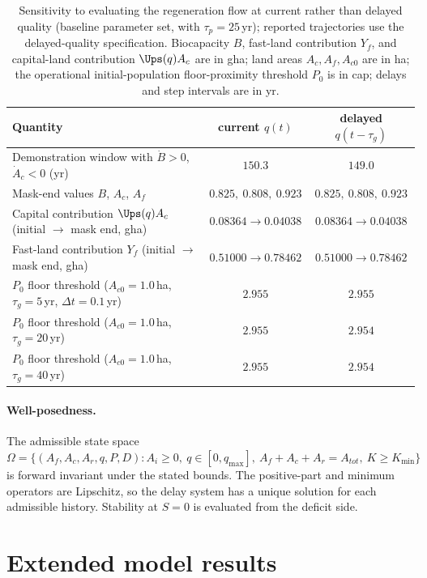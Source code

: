 \begin{table}[htbp]
\centering\small
\caption{Sensitivity to evaluating the regeneration flow at current rather than delayed quality (baseline parameter set, with $\tau_p=25$\,yr); reported trajectories use the delayed-quality specification. Biocapacity $B$, fast-land contribution $Y_f$, and capital-land contribution $\Ups(q)A_c$ are in gha; land areas $A_c,A_f,A_{c0}$ are in ha; the operational initial-population floor-proximity threshold $P_0$ is in cap; delays and step intervals are in yr.}
\label{tab:si_delay}
\begin{tabularx}{\textwidth}{>{\raggedright\arraybackslash}Xcc}
\toprule
Quantity & current $q(t)$ & delayed $q(t-\tau_g)$ \\
\midrule
Demonstration window with $\dot B>0$, $\dot A_c<0$ (yr) & $150.3$ & $149.0$ \\
Mask-end values $B$, $A_c$, $A_f$ & $0.825,\ 0.808,\ 0.923$ & $0.825,\ 0.808,\ 0.923$ \\
Capital contribution $\Ups(q)A_c$ (initial $\to$ mask end, gha) & $0.08364\to0.04038$ & $0.08364\to0.04038$ \\
Fast-land contribution $Y_f$ (initial $\to$ mask end, gha) & $0.51000\to0.78462$ & $0.51000\to0.78462$ \\
$P_0$ floor threshold ($A_{c0}=1.0$\,ha, $\tau_g=5$\,yr, $\Delta t=0.1$\,yr) & $2.955$ & $2.955$ \\
$P_0$ floor threshold ($A_{c0}=1.0$\,ha, $\tau_g=20$\,yr) & $2.955$ & $2.954$ \\
$P_0$ floor threshold ($A_{c0}=1.0$\,ha, $\tau_g=40$\,yr) & $2.955$ & $2.954$ \\
\bottomrule
\end{tabularx}
\end{table}

\paragraph{Well-posedness.} The admissible state space $\Omega=\{(A_f,A_c,A_r,q,P,D):A_i\ge0,\ q\in[0,q_{\max}],\ A_f+A_c+A_r=A_{tot},\ K\ge K_{\min}\}$ is forward invariant under the stated bounds. The positive-part and minimum operators are Lipschitz, so the delay system has a unique solution for each admissible history. Stability at $S=0$ is evaluated from the deficit side.

\section{Extended model results}\label{si:results}

